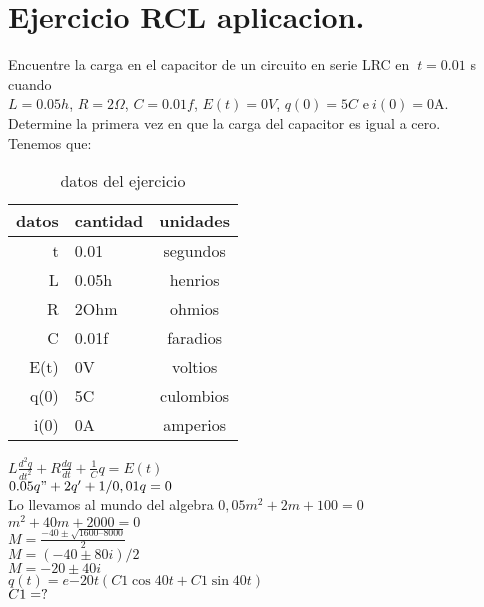 \documentclass[12pt,a4paper]{article}
\begin{document}
\section{Ejercicio RCL aplicacion. }
Encuentre la carga en el capacitor de un circuito en serie LRC en
$\ t = 0.01$ s cuando \\
$L=0.05 h$, 
$R = 2\varOmega$, 
$C= 0.01 f$,
$ E(t) = 0 V$, 
$q(0) = 5 C$ 
e$\ i(0) = 0 $A. Determine la primera vez en que la carga del capacitor es igual a cero.\vspace{5mm}\\
Tenemos que:
\begin{table}[t]
\begin{center}
\begin{tabular}{| r | l | c |}
datos & cantidad & unidades \\ \hline
t     & 0.01 &  segundos \\\hline
L     & 0.05h& henrios\\\hline
R     & 2Ohm& ohmios \\\hline
C     & 0.01f& faradios\\\hline
E(t)   &   0V& voltios\\\hline
q(0)&  5C&culombios\\\hline
i(0)&  0A&amperios\\ \hline
\end{tabular}
\caption{datos del ejercicio}
\label{tab:fruta}
\end{center}
\end{table}
$L\frac{d^2q}{dt^2} +R\frac{dq}{dt} + \frac{1}{C}q = E(t) $\vspace{5mm}\\
 $0.05q" + 2q' +1/ 0,01q=0$\vspace{5mm}\\
 Lo llevamos al mundo del algebra
$0,05m^2+2m+ 100 = 0 $\vspace{5mm}\\
$ m^2 + 40m + 2000 = 0$\vspace{5mm}\\
$M=\frac{-40\pm\sqrt{1600–8000}}{2} $\vspace{5mm}\\
$M=(-40 \pm 80i)/2$\vspace{5mm}\\
$M=-20\pm40i$\vspace{5mm}\\
$q(t) = e{-20t} (C1 \cos40 t+ C1 \sin 40t)$\vspace{5mm}\\
$C1=?\vspace{5mm}\\$
\end{document}
